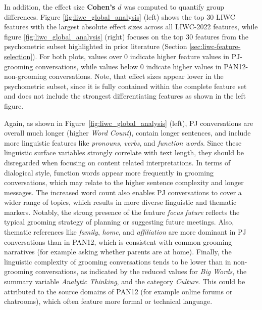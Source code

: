 In addition, the effect size \textbf{Cohen’s $d$} \cite{cohen1988} was computed to quantify group differences. Figure \ref{fig:liwc_global_analysis} (left) shows the top 30 LIWC features with the largest absolute effect sizes across all LIWC-2022 features, while figure \ref{fig:liwc_global_analysis} (right) focuses on the top 30 features from the psychometric subset highlighted in prior literature (Section \ref{sec:liwc-feature-selection}). For both plots, values over 0 indicate higher feature values in PJ-grooming conversations, while values below 0 indicate higher values in PAN12-non-grooming conversations. Note, that effect sizes appear lower in the psychometric subset, since it is fully contained within the complete feature set and does not include the strongest differentiating features as shown in the left figure. 

Again, as shown in Figure~\ref{fig:liwc_global_analysis} (left), PJ conversations are overall much longer (higher \textit{Word Count}), contain longer sentences, and include more linguistic features like \textit{pronouns}, \textit{verbs}, and \textit{function words}. Since these linguistic surface variables strongly correlate with text length, they should be disregarded when focusing on content related interpretations. In terms of dialogical style, function words appear more frequently in grooming conversations, which may relate to the higher sentence complexity and longer messages. The increased word count also enables PJ conversations to cover a wider range of topics, which results in more diverse linguistic and thematic markers. Notably, the strong presence of the feature \textit{focus future} reflects the typical grooming strategy of planning or suggesting future meetings. Also, thematic references like \textit{family}, \textit{home}, and \textit{affiliation} are more dominant in PJ conversations than in PAN12, which is consistent with common grooming narratives (for example asking whether parents are at home).  Finally, the linguistic complexity of grooming conversations tends to be lower than in non-grooming conversations, as indicated by the reduced values for \textit{Big Words}, the summary variable \textit{Analytic Thinking}, and the category \textit{Culture}. This could be attributed to the source domains of PAN12 (for example online forums or chatrooms), which often feature more formal or technical language.

